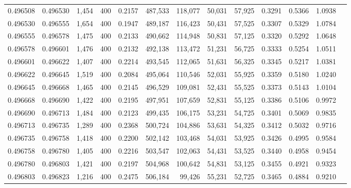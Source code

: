 \begin{tabular}{rrrrrrrrrrrrr}
0.496508 & 0.496530 &  1,454 & 400 &                                     0.2157 & 487,533 & 118,077 &  50,031 &  57,925 & 0.3291 & 0.5366 & 1.0938 \\
0.496530 & 0.496555 &  1,654 & 400 &                                     0.1947 & 489,187 & 116,423 &  50,431 &  57,525 & 0.3307 & 0.5329 & 1.0784 \\
0.496555 & 0.496578 &  1,475 & 400 &                                     0.2133 & 490,662 & 114,948 &  50,831 &  57,125 & 0.3320 & 0.5292 & 1.0648 \\
0.496578 & 0.496601 &  1,476 & 400 &                                     0.2132 & 492,138 & 113,472 &  51,231 &  56,725 & 0.3333 & 0.5254 & 1.0511 \\
0.496601 & 0.496622 &  1,407 & 400 &                                     0.2214 & 493,545 & 112,065 &  51,631 &  56,325 & 0.3345 & 0.5217 & 1.0381 \\
0.496622 & 0.496645 &  1,519 & 400 &                                     0.2084 & 495,064 & 110,546 &  52,031 &  55,925 & 0.3359 & 0.5180 & 1.0240 \\
0.496645 & 0.496668 &  1,465 & 400 &                                     0.2145 & 496,529 & 109,081 &  52,431 &  55,525 & 0.3373 & 0.5143 & 1.0104 \\
0.496668 & 0.496690 &  1,422 & 400 &                                     0.2195 & 497,951 & 107,659 &  52,831 &  55,125 & 0.3386 & 0.5106 & 0.9972 \\
0.496690 & 0.496713 &  1,484 & 400 &                                     0.2123 & 499,435 & 106,175 &  53,231 &  54,725 & 0.3401 & 0.5069 & 0.9835 \\
0.496713 & 0.496735 &  1,289 & 400 &                                     0.2368 & 500,724 & 104,886 &  53,631 &  54,325 & 0.3412 & 0.5032 & 0.9716 \\
0.496735 & 0.496758 &  1,418 & 400 &                                     0.2200 & 502,142 & 103,468 &  54,031 &  53,925 & 0.3426 & 0.4995 & 0.9584 \\
0.496758 & 0.496780 &  1,405 & 400 &                                     0.2216 & 503,547 & 102,063 &  54,431 &  53,525 & 0.3440 & 0.4958 & 0.9454 \\
0.496780 & 0.496803 &  1,421 & 400 &                                     0.2197 & 504,968 & 100,642 &  54,831 &  53,125 & 0.3455 & 0.4921 & 0.9323 \\
0.496803 & 0.496823 &  1,216 & 400 &                                     0.2475 & 506,184 &  99,426 &  55,231 &  52,725 & 0.3465 & 0.4884 & 0.9210 \\

\end{tabular}
